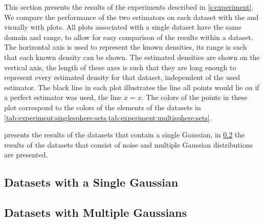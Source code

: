 

This section presents the results of the experiments described in \cref{s:experiment}. 
We compare the performance of the two estimators on each dataset with the \mse and visually with plots. 
	All plots associated with a single dataset have the same domain and range, to allow for easy comparison of the results within a dataset. The horizontal axis is used to represent the known densities, its range is such that each known density can be shown. The estimated densities are shown on the vertical axis, the length of these axes is such that they are long enough to represent every estimated density for that dataset, independent of the used estimator. 
	The black line in each plot illustrates the line all points would lie on if a perfect estimator was used, \ie the line $x = x$.
	The colors of the points in these plot correspond to the colors of the elements of the datasets in \cref{tab:experiment:singlesphere:sets,tab:experiment:multisphere:sets}.

	 presents the results of the datasets that contain a single Gaussian, in \cref{s:results:multipleGaussian} the results of the datasets that consist of noise and multiple Gaussian distributions are presented. 

\subsection{Datasets with a Single Gaussian}
\label{s:results:singleGaussian}


\subsection{Datasets with Multiple Gaussians}
\label{s:results:multipleGaussian}

